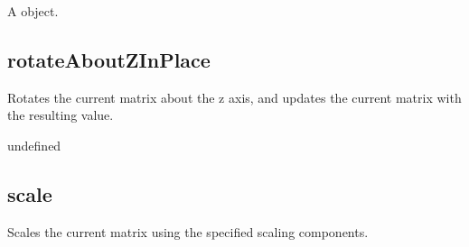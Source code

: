 \documentclass[letterpaper,12pt,english,openany,oneside]{sphinxmanual}
\begin{document}
\label{\detokenize{JS_3D_API:syntax-51}}

\begin{sphinxVerbatim}[commandchars=\\\{\}]
\end{sphinxVerbatim}
\label{\detokenize{JS_3D_API:parameters-38}}

\label{\detokenize{JS_3D_API:section-57}}\label{\detokenize{JS_3D_API:returns-52}}

A  object.


\subsection{rotateAboutZInPlace}
\label{\detokenize{JS_3D_API:rotateaboutzinplace}}
Rotates the current matrix about the z axis, and updates the current matrix with the resulting value.

\label{\detokenize{JS_3D_API:syntax-52}}

\begin{sphinxVerbatim}[commandchars=\\\{\}]
\end{sphinxVerbatim}
\label{\detokenize{JS_3D_API:parameters-39}}

\label{\detokenize{JS_3D_API:section-58}}\label{\detokenize{JS_3D_API:returns-53}}

undefined


\subsection{scale}
\label{\detokenize{JS_3D_API:scale}}
Scales the current matrix using the specified scaling components.

\label{\detokenize{JS_3D_API:syntax-53}}

\begin{sphinxVerbatim}[commandchars=\\\{\}]
  
\end{sphinxVerbatim}
\label{\detokenize{JS_3D_API:parameters-40}}
\end{document}
